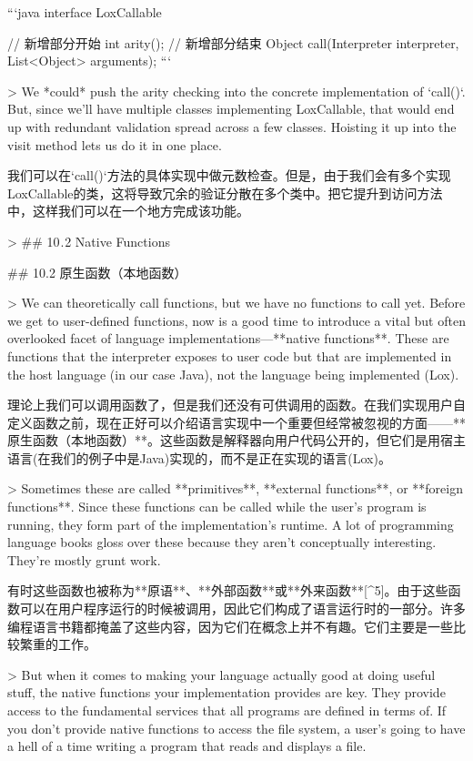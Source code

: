 \documentclass[cn,11pt,chinese]{elegantbook}
\begin{document}
```java
interface LoxCallable {
  // 新增部分开始
  int arity();
  // 新增部分结束
  Object call(Interpreter interpreter, List<Object> arguments);
```

> We *could* push the arity checking into the concrete implementation of `call()`. But, since we’ll have multiple classes implementing LoxCallable, that would end up with redundant validation spread across a few classes. Hoisting it up into the visit method lets us do it in one place.

我们可以在`call()`方法的具体实现中做元数检查。但是，由于我们会有多个实现LoxCallable的类，这将导致冗余的验证分散在多个类中。把它提升到访问方法中，这样我们可以在一个地方完成该功能。

> ## 10 . 2 Native Functions

## 10.2 原生函数（本地函数）

> We can theoretically call functions, but we have no functions to call yet. Before we get to user-defined functions, now is a good time to introduce a vital but often overlooked facet of language implementations—**native functions**. These are functions that the interpreter exposes to user code but that are implemented in the host language (in our case Java), not the language being implemented (Lox).

理论上我们可以调用函数了，但是我们还没有可供调用的函数。在我们实现用户自定义函数之前，现在正好可以介绍语言实现中一个重要但经常被忽视的方面——**原生函数（本地函数）**。这些函数是解释器向用户代码公开的，但它们是用宿主语言(在我们的例子中是Java)实现的，而不是正在实现的语言(Lox)。

> Sometimes these are called **primitives**, **external functions**, or **foreign functions**. Since these functions can be called while the user’s program is running, they form part of the implementation’s runtime. A lot of programming language books gloss over these because they aren’t conceptually interesting. They’re mostly grunt work.

有时这些函数也被称为**原语**、**外部函数**或**外来函数**[^5]。由于这些函数可以在用户程序运行的时候被调用，因此它们构成了语言运行时的一部分。许多编程语言书籍都掩盖了这些内容，因为它们在概念上并不有趣。它们主要是一些比较繁重的工作。

> But when it comes to making your language actually good at doing useful stuff, the native functions your implementation provides are key. They provide access to the fundamental services that all programs are defined in terms of. If you don’t provide native functions to access the file system, a user’s going to have a hell of a time writing a program that reads and displays a file.

}
\end{document}
